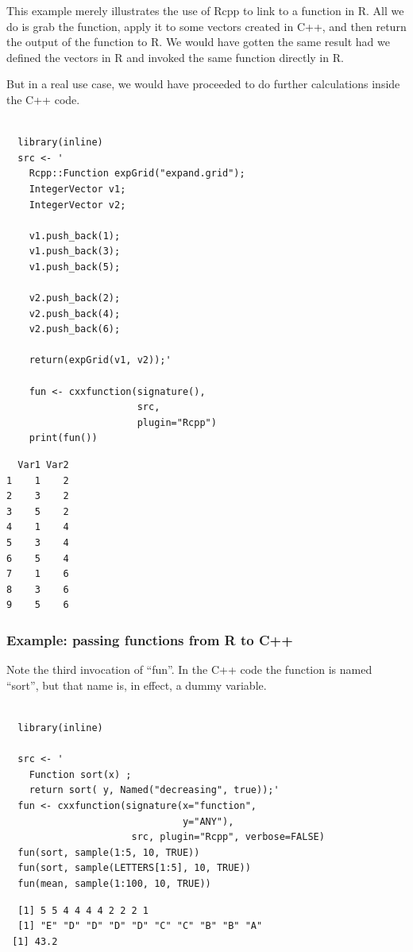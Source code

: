 \documentclass[11pt]{article}
\begin{document}
This example merely illustrates the use of Rcpp to link to a function
in R.  All we do is grab the function, apply it to some vectors
created in C++, and then return the output of the function to R.  We
would have gotten the same result had we defined the vectors in R and
invoked the same function directly in R.

But in a real use case, we would have proceeded to do further
calculations inside the C++ code.


\begin{verbatim}
   
  library(inline)
  src <- '
    Rcpp::Function expGrid("expand.grid");
    IntegerVector v1;
    IntegerVector v2;

    v1.push_back(1);
    v1.push_back(3);
    v1.push_back(5);

    v2.push_back(2);
    v2.push_back(4);
    v2.push_back(6);

    return(expGrid(v1, v2));'
  
    fun <- cxxfunction(signature(),
                       src,
                       plugin="Rcpp")
    print(fun())
\end{verbatim}


\begin{verbatim}
  Var1 Var2
1    1    2
2    3    2
3    5    2
4    1    4
5    3    4
6    5    4
7    1    6
8    3    6
9    5    6
\end{verbatim}
\subsubsection{Example: passing functions from R to C++}
\label{sec-7-3-2}


Note the third invocation of ``fun''.  In the C++ code the function is
named ``sort'', but that name is, in effect, a dummy variable.


\begin{verbatim}
  
  library(inline)

  src <- '
    Function sort(x) ;
    return sort( y, Named("decreasing", true));'
  fun <- cxxfunction(signature(x="function",
                               y="ANY"),
                      src, plugin="Rcpp", verbose=FALSE)
  fun(sort, sample(1:5, 10, TRUE))
  fun(sort, sample(LETTERS[1:5], 10, TRUE))
  fun(mean, sample(1:100, 10, TRUE))
\end{verbatim}

\begin{verbatim}
  [1] 5 5 4 4 4 4 2 2 2 1
  [1] "E" "D" "D" "D" "D" "C" "C" "B" "B" "A"
 [1] 43.2
\end{verbatim}
\end{document}
